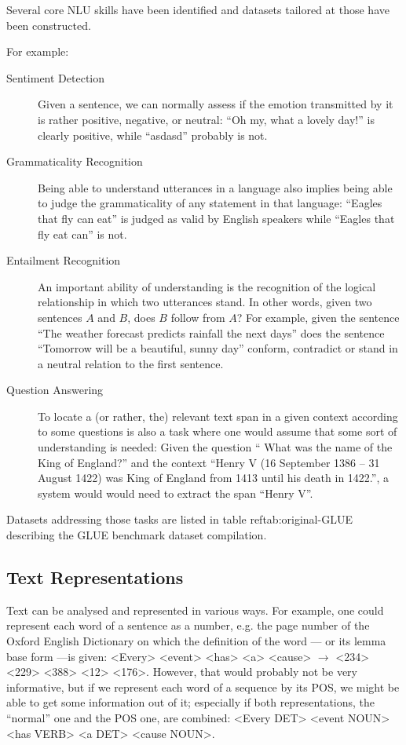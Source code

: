 Several core NLU {\color{red} skills} have been identified and datasets tailored at those
have been constructed.

For example:

\begin{description}
  \item[Sentiment Detection] Given a sentence, we can normally assess if the emotion transmitted by
      it is rather positive, negative, or neutral: ``Oh my, what a lovely day!'' is clearly positive,
      while  ``asdasd'' probably is not.
  \item[Grammaticality Recognition] Being able to understand utterances in a language also implies
      being able to judge the grammaticality of any statement in that language: ``Eagles that fly can
      eat'' is judged as valid by English speakers while ``Eagles that fly eat can'' is not.
  \item[Entailment Recognition] An important ability of understanding is the recognition of the
      logical relationship in which two utterances stand. In other words, given two sentences $A$ and
      $B$, does $B$ follow from $A$? For example, given the sentence ``The weather forecast predicts
      rainfall the next days'' does the sentence ``Tomorrow will be a beautiful, sunny day'' conform,
      contradict or stand in a neutral relation to the first sentence.
  \item[Question Answering] To locate a (or rather, the) relevant text span in a given context according to some
      questions is also a task where one would assume that some sort of understanding is needed:
      Given the question `` What was the name of the King of England?'' and the context ``Henry
      V (16 September 1386 – 31 August 1422) was King of England from 1413 until his death in
      1422.'', a system would would need to extract the span ``Henry V''.
\end{description}

Datasets addressing those tasks are listed in table ref{tab:original-GLUE} describing the GLUE
benchmark dataset compilation.


\subsection{Text Representations}

Text can be analysed and represented in various ways. For example, one could represent each word of a sentence as
a number, e.g. the page number of the Oxford English Dictionary on which the definition
of the word --- or its lemma base form ---is given: <Every> <event> <has> <a> <cause>
$\rightarrow$ <234> <229> <388> <12> <176>. However, that would probably not be very
informative, but if we represent each word of a sequence by its POS, we might be able to
get some information out of it; especially if both representations, the ``normal'' one
and the POS one, are combined: <Every DET> <event NOUN> <has VERB> <a DET> <cause NOUN>.


